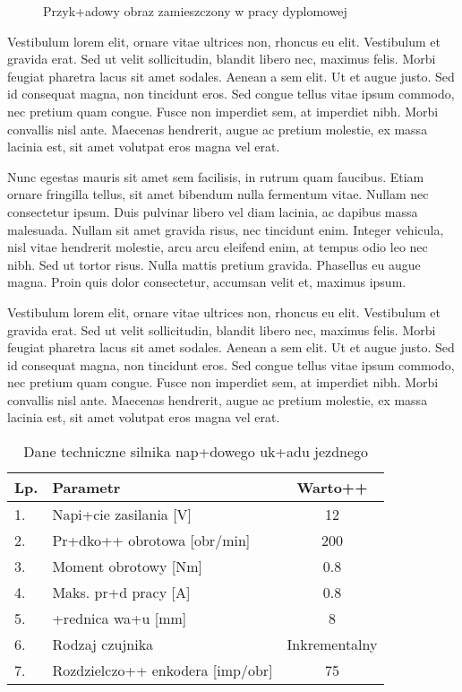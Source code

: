 \begin{figure}[ht]
\centering
\caption{Przyk+adowy obraz zamieszczony w pracy dyplomowej}
\label{img/template1}
\end{figure}
Vestibulum lorem elit, ornare vitae ultrices non, rhoncus eu elit. Vestibulum et
gravida erat. Sed ut velit sollicitudin, blandit libero nec, maximus felis.
Morbi feugiat pharetra lacus sit amet sodales. Aenean a sem elit. Ut et augue
justo. Sed id consequat magna, non tincidunt eros. Sed congue tellus vitae ipsum
commodo, nec pretium quam congue. Fusce non imperdiet sem, at imperdiet nibh.
Morbi convallis nisl ante. Maecenas hendrerit, augue ac pretium molestie, ex
massa lacinia est, sit amet volutpat eros magna vel erat.

Nunc egestas mauris sit amet sem facilisis, in rutrum quam faucibus. Etiam
ornare fringilla tellus, sit amet bibendum nulla fermentum vitae. Nullam nec
consectetur ipsum. Duis pulvinar libero vel diam lacinia, ac dapibus massa
malesuada. Nullam sit amet gravida risus, nec tincidunt enim. Integer vehicula,
nisl vitae hendrerit molestie, arcu arcu eleifend enim, at tempus odio leo nec
nibh. Sed ut tortor risus. Nulla mattis pretium gravida. Phasellus eu augue
magna. Proin quis dolor consectetur, accumsan velit et, maximus ipsum. 

Vestibulum lorem elit, ornare vitae ultrices non, rhoncus eu elit. Vestibulum et
gravida erat. Sed ut velit sollicitudin, blandit libero nec, maximus felis.
Morbi feugiat pharetra lacus sit amet sodales. Aenean a sem elit. Ut et augue
justo. Sed id consequat magna, non tincidunt eros. Sed congue tellus vitae ipsum
commodo, nec pretium quam congue. Fusce non imperdiet sem, at imperdiet nibh.
Morbi convallis nisl ante. Maecenas hendrerit, augue ac pretium molestie, ex
massa lacinia est, sit amet volutpat eros magna vel erat.

\begin{table}[ht]
\captionsetup{justification=centering}
\caption{Dane techniczne silnika nap+dowego uk+adu jezdnego}
\centering
    \begin{tabular}{|l|l|c|}
    \hline
    \multicolumn{1}{|l|}{\textbf{Lp.}} & \multicolumn{1}{l|}{\textbf{Parametr}}
    & \multicolumn{1}{c|}{\textbf{Warto++}} \\
    \hline
       1.   & Napi+cie zasilania [V] & 12  \\
    \hline
       2.   &  Pr+dko++ obrotowa [obr/min]& 200\\
    \hline
       3.  & Moment obrotowy [Nm]   & 0.8 \\
    \hline
       4.  & Maks. pr+d pracy [A]      &  0.8 \\
    \hline
       5.  & +rednica wa+u [mm]     &  8 \\
    \hline
       6.  & Rodzaj czujnika     &  Inkrementalny   \\
    \hline
       7.  & Rozdzielczo++ enkodera [imp/obr]   &  75 \\
    \hline
    \end{tabular}
  \label{silnik_skret}
\end{table}

